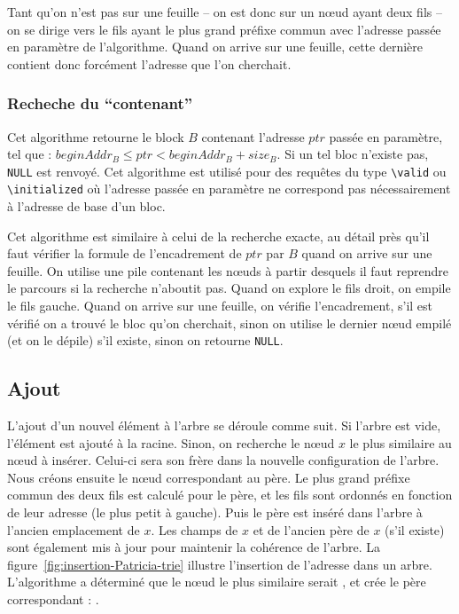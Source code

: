 Tant qu'on n'est pas sur une feuille -- on est donc sur un n\oe{}ud ayant deux
fils -- on se dirige vers le fils ayant le plus grand préfixe commun avec
l'adresse passée en paramètre de l'algorithme.
Quand on arrive sur une feuille, cette dernière contient donc forcément
l'adresse que l'on cherchait.

\subsubsection*{Recheche du ``contenant''}


Cet algorithme retourne le block $B$ contenant l'adresse $ptr$ passée en
paramètre, tel que : $beginAddr_B \le ptr < beginAddr_B + size_B$.
Si un tel bloc n'existe pas, \lstinline{NULL} est renvoyé.
Cet algorithme est utilisé pour des requêtes du type \lstinline{\valid} ou
\lstinline{\initialized} où l'adresse passée en paramètre ne correspond pas
nécessairement à l'adresse de base d'un bloc.

Cet algorithme est similaire à celui de la recherche exacte, au détail près
qu'il faut vérifier la formule de l'encadrement de $ptr$ par $B$ quand on arrive
sur une feuille.
On utilise une pile contenant les n\oe{}uds à partir desquels il faut reprendre
le parcours si la recherche n'aboutit pas.
Quand on explore le fils droit, on empile le fils gauche.
Quand on arrive sur une feuille, on vérifie l'encadrement, s'il est vérifié on
a trouvé le bloc qu'on cherchait, sinon on utilise le dernier n\oe{}ud empilé
(et on le dépile) s'il existe, sinon on retourne \lstinline{NULL}.

\subsection{Ajout}






L'ajout d'un nouvel élément à l'arbre se déroule comme suit. Si l'arbre est
vide, l'élément est ajouté à la racine.
Sinon, on recherche le n\oe{}ud $x$ le plus similaire au n\oe{}ud à insérer.
Celui-ci sera son frère dans la nouvelle configuration de l'arbre.
Nous créons ensuite le n\oe{}ud correspondant au père.
Le plus grand préfixe commun des deux fils est calculé pour le père, et les fils
sont ordonnés en fonction de leur adresse (le plus petit à gauche).
Puis le père est inséré dans l'arbre à l'ancien emplacement de $x$.
Les champs de $x$ et de l'ancien père de $x$ (s'il existe) sont également mis à
jour pour maintenir la cohérence de l'arbre.
La figure~\ref{fig:insertion-Patricia-trie} illustre l'insertion de l'adresse
 dans un arbre.
L'algorithme a déterminé que le n\oe{}ud le plus similaire serait
, et crée le père correspondant :
.


